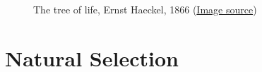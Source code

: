 \documentclass[11pt,a4paper]{book}
\begin{document}
\begin{figure}[!t]
\begin{center}
\caption{The tree of life, Ernst Haeckel, 1866
(\href{http://commons.wikimedia.org/wiki/File:Haeckel_arbol_bn.png}{Image source})
}
\label{haeckel}
\end{center}
\end{figure}



\section{Natural Selection}
\end{document}
